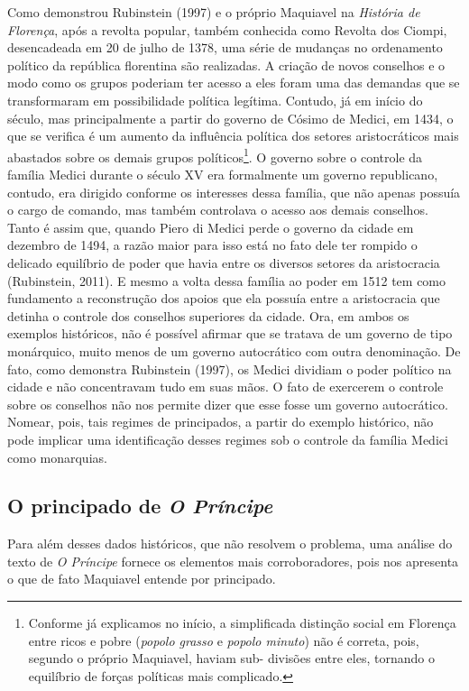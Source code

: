Como demonstrou Rubinstein (1997) e o próprio Maquiavel na
\emph{História de Florença}, após a revolta popular, também conhecida
como Revolta dos Ciompi, desencadeada em 20 de julho de 1378, uma série
de mudanças no ordenamento político da república florentina são
realizadas. A criação de novos conselhos e o modo como os grupos
poderiam ter acesso a eles foram uma das demandas que se transformaram
em possibilidade política legítima. Contudo, já em início do século, mas
principalmente a partir do governo de Cósimo de Medici, em 1434, o que
se verifica é um aumento da influência política dos setores
aristocráticos mais abastados sobre os demais grupos políticos\footnote{Conforme
  já explicamos no início, a simplificada distinção social em Florença
  entre ricos e pobre (\emph{popolo grasso} e \emph{popolo minuto}) não
  é correta, pois, segundo o próprio Maquiavel, haviam sub- divisões
  entre eles, tornando o equilíbrio de forças políticas mais complicado.}.
O governo sobre o controle da família Medici durante o século XV era
formalmente um governo republicano, contudo, era dirigido conforme os
interesses dessa família, que não apenas possuía o cargo de comando, mas
também controlava o acesso aos demais conselhos. Tanto é assim que,
quando Piero di Medici perde o governo da cidade em dezembro de 1494, a
razão maior para isso está no fato dele ter rompido o delicado
equilíbrio de poder que havia entre os diversos setores da aristocracia
(Rubinstein, 2011). E mesmo a volta dessa família ao poder em 1512 tem
como fundamento a reconstrução dos apoios que ela possuía entre a
aristocracia que detinha o controle dos conselhos superiores da cidade.
Ora, em ambos os exemplos históricos, não é possível afirmar que se
tratava de um governo de tipo monárquico, muito menos de um governo
autocrático com outra denominação. De fato, como demonstra Rubinstein
(1997), os Medici dividiam o poder político na cidade e não concentravam
tudo em suas mãos. O fato de exercerem o controle sobre os conselhos não
nos permite dizer que esse fosse um governo autocrático. Nomear, pois,
tais regimes de principados, a partir do exemplo histórico, não pode
implicar uma identificação desses regimes sob o controle da família
Medici como monarquias.

\subsection{O principado de \emph{O Príncipe}}

Para além desses dados históricos, que não resolvem o problema, uma
análise do texto de \emph{O Príncipe} fornece os elementos mais
corroboradores, pois nos apresenta o que de fato Maquiavel entende por
principado.

